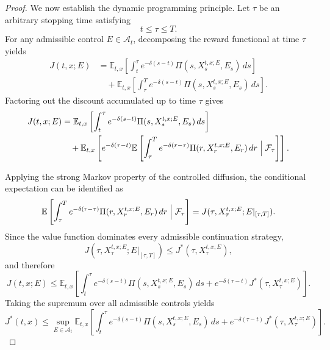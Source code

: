 \documentclass[11pt]{article}
\begin{document}
\begin{proof}
		We now establish the dynamic programming principle. Let $\tau$ be an arbitrary stopping time satisfying
		\[
		t\le\tau\le T.
		\]
		For any admissible control $E\in\mathcal{A}_t$, decomposing the reward functional at time $\tau$ yields
		\[
		\begin{aligned}
			J(t,x;E)
			&=
			\mathbb{E}_{t,x}
			\left[
			\int_t^\tau
			e^{-\delta(s-t)}
			\Pi(s,X_s^{t,x;E},E_s)\,ds
			\right]
			\\
			&\quad
			+
			\mathbb{E}_{t,x}
			\left[
			\int_\tau^T
			e^{-\delta(s-t)}
			\Pi(s,X_s^{t,x;E},E_s)\,ds
			\right].
		\end{aligned}
		\]
		Factoring out the discount accumulated up to time $\tau$ gives
		\[
		\begin{aligned}
			J(t,x;E)
			&=
			\mathbb{E}_{t,x}
			\left[
			\int_t^\tau
			e^{-\delta(s-t)}
			\Pi(s,X_s^{t,x;E},E_s)\,ds
			\right]
			\\
			&\quad
			+
			\mathbb{E}_{t,x}
			\left[
			e^{-\delta(\tau-t)}
			\mathbb{E}
			\left[
			\int_\tau^T
			e^{-\delta(r-\tau)}
			\Pi(r,X_r^{t,x;E},E_r)\,dr
			\Bigm|
			\mathcal{F}_\tau
			\right]
			\right].
		\end{aligned}
		\]
		
		Applying the strong Markov property of the controlled diffusion, the conditional expectation can be identified as
		\[
		\mathbb{E}
		\left[
		\int_\tau^T
		e^{-\delta(r-\tau)}
		\Pi(r,X_r^{t,x;E},E_r)\,dr
		\Bigm|
		\mathcal{F}_\tau
		\right]
		=
		J(\tau,X_\tau^{t,x;E};E|_{[\tau,T]}).
		\]
		Since the value function dominates every admissible continuation strategy,
		\[
		J(\tau,X_\tau^{t,x;E};E|_{[\tau,T]})
		\le
		J^*(\tau,X_\tau^{t,x;E}),
		\]
		and therefore
		\[
		J(t,x;E)
		\le
		\mathbb{E}_{t,x}
		\left[
		\int_t^\tau
		e^{-\delta(s-t)}
		\Pi(s,X_s^{t,x;E},E_s)\,ds
		+
		e^{-\delta(\tau-t)}
		J^*(\tau,X_\tau^{t,x;E})
		\right].
		\]
		Taking the supremum over all admissible controls yields
		\[
		J^*(t,x)
		\le
		\sup_{E\in\mathcal{A}_t}
		\mathbb{E}_{t,x}
		\left[
		\int_t^\tau
		e^{-\delta(s-t)}
		\Pi(s,X_s^{t,x;E},E_s)\,ds
		+
		e^{-\delta(\tau-t)}
		J^*(\tau,X_\tau^{t,x;E})
		\right].
		\]
		

\end{proof}
\end{document}
